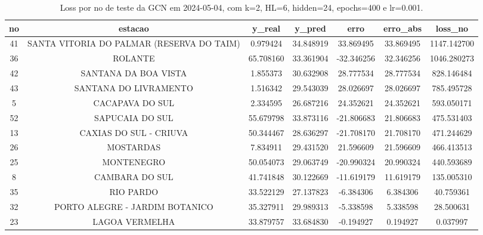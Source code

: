 \begin{table}[h]
\centering
\caption{Loss por no de teste da GCN em 2024-05-04, com k=2, HL=6, hidden=24, epochs=400 e lr=0.001.}
\label{tab:gcn_loss_k2_hl6_h24_e400_d20240504}
\begin{tabular}{ccccccc}
\toprule
no & estacao & y\_real & y\_pred & erro & erro\_abs & loss\_no \\
\midrule
41 & SANTA VITORIA DO PALMAR (RESERVA DO TAIM) & 0.979424 & 34.848919 & 33.869495 & 33.869495 & 1147.142700 \\
36 & ROLANTE & 65.708160 & 33.361904 & -32.346256 & 32.346256 & 1046.280273 \\
42 & SANTANA DA BOA VISTA & 1.855373 & 30.632908 & 28.777534 & 28.777534 & 828.146484 \\
43 & SANTANA DO LIVRAMENTO & 1.516342 & 29.543039 & 28.026697 & 28.026697 & 785.495728 \\
5 & CACAPAVA DO SUL & 2.334595 & 26.687216 & 24.352621 & 24.352621 & 593.050171 \\
52 & SAPUCAIA DO SUL & 55.679798 & 33.873116 & -21.806683 & 21.806683 & 475.531403 \\
13 & CAXIAS DO SUL - CRIUVA & 50.344467 & 28.636297 & -21.708170 & 21.708170 & 471.244629 \\
26 & MOSTARDAS & 7.834911 & 29.431520 & 21.596609 & 21.596609 & 466.413513 \\
25 & MONTENEGRO & 50.054073 & 29.063749 & -20.990324 & 20.990324 & 440.593689 \\
8 & CAMBARA DO SUL & 41.741848 & 30.122669 & -11.619179 & 11.619179 & 135.005310 \\
35 & RIO PARDO & 33.522129 & 27.137823 & -6.384306 & 6.384306 & 40.759361 \\
32 & PORTO ALEGRE - JARDIM BOTANICO & 35.327911 & 29.989313 & -5.338598 & 5.338598 & 28.500631 \\
23 & LAGOA VERMELHA & 33.879757 & 33.684830 & -0.194927 & 0.194927 & 0.037997 \\
\bottomrule
\end{tabular}
\end{table}
